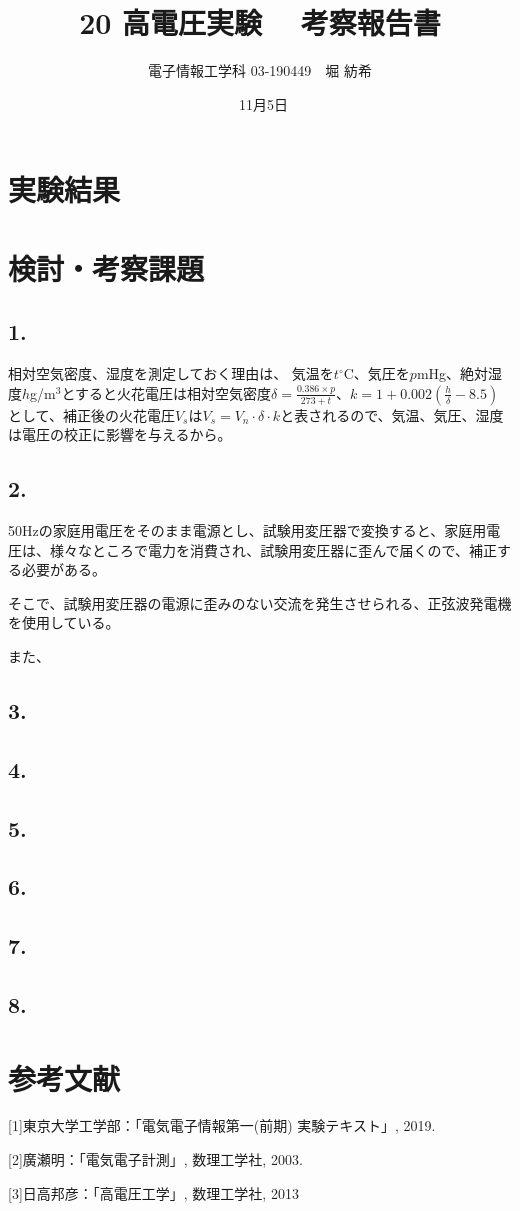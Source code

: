 \documentclass[dvipdfmx]{jsarticle}
\begin{document}
\title{20 高電圧実験　 考察報告書　}
\author{電子情報工学科 03-190449　堀 紡希}
\date{\ 11月5日}
\maketitle

\section{実験結果}


\section{検討・考察課題}
\subsection*{1.}
相対空気密度、湿度を測定しておく理由は、
気温を$t^\circ$C、気圧を$p$mHg、絶対湿度$h$g/m$^{3}$とすると火花電圧は相対空気密度$\delta = \frac{0.386\times p}{273+t}$、$k = 1 + 0.002\left(\frac{h}{\delta} - 8.5\right)$として、補正後の火花電圧$V_{s}$は$V_{s} = V_{n}\cdot \delta \cdot k$と表されるので、気温、気圧、湿度は電圧の校正に影響を与えるから。

\subsection*{2.}
50Hzの家庭用電圧をそのまま電源とし、試験用変圧器で変換すると、家庭用電圧は、様々なところで電力を消費され、試験用変圧器に歪んで届くので、補正する必要がある。

そこで、試験用変圧器の電源に歪みのない交流を発生させられる、正弦波発電機を使用している。


また、
\subsection*{3.}


\subsection*{4.}


\subsection*{5.}


\subsection*{6.}

\subsection*{7.}

\subsection*{8.}


\section{参考文献}
[1]東京大学工学部：「電気電子情報第一(前期) 実験テキスト」, 2019.

[2]廣瀬明：「電気電子計測」, 数理工学社, 2003.

[3]日高邦彦：「高電圧工学」, 数理工学社, 2013
\end{document}
